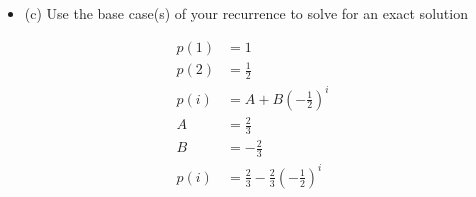 \documentclass{article}
\begin{document}
\begin{enumerate}
\newpage
\begin{itemize}
    \item (c) Use the base case(s) of your recurrence to solve for an exact solution
\end{itemize}
\begin{align*}
    p(1) & = 1 \\
    p(2) & = \frac{1}{2} \\
    p(i) & = A + B(-\frac{1}{2})^i \\
    A & = \frac{2}{3} \\
    B & = -\frac{2}{3} \\
    p(i) & = \frac{2}{3} -\frac{2}{3}(-\frac{1}{2})^i
\end{align*}








\end{enumerate}
\end{document}
